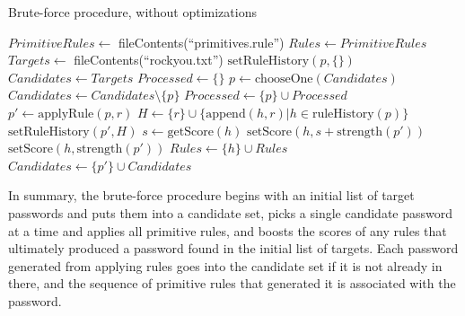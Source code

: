 \documentclass[letterpaper,twocolumn,10pt]{article}
\begin{document}
\begin{algorithm}\caption{Brute-force procedure, without optimizations}
\begin{algorithmic}[1]
\State $PrimitiveRules \gets $ fileContents(``primitives.rule'')
\State $Rules \gets PrimitiveRules$
\State $Targets \gets $ fileContents(``rockyou.txt'')
  \State $\mathrm{setRuleHistory}(p, \{\})$
\EndFor
\State $Candidates \gets Targets$
\State $Processed \gets \{\}$
  \State $p \gets \mathrm{chooseOne}(Candidates)$
  \State $Candidates \gets Candidates \setminus \{p\}$
  \State $Processed \gets \{p\} \cup Processed$
    \State $p' \gets \mathrm{applyRule}(p, r)$
    \State $H \gets \{r\}\cup\{\mathrm{append}(h, r)|h \in
\mathrm{ruleHistory}(p)\}$
    \State $\mathrm{setRuleHistory}(p', H)$
          \State $s \gets \mathrm{getScore}(h)$
          \State $\mathrm{setScore}(h,
s+\mathrm{strength}(p'))$
        \Else
          \State $\mathrm{setScore}(h, \mathrm{strength}(p'))$
          \State $Rules \gets \{h\}\cup Rules$
        \EndIf
      \EndFor
    \EndIf
      \State $Candidates \gets \{p'\}\cup Candidates$
    \EndIf
  \EndFor
\EndWhile
\end{algorithmic}
\end{algorithm}

In summary, the brute-force procedure begins with an initial list of target
passwords and puts them into a candidate set, picks a single candidate password
at a time and applies all primitive rules, and boosts the scores of any rules
that ultimately produced a password found in the initial list of targets. Each
password generated from applying rules goes into the candidate set if it is not
already in there, and the sequence of primitive rules that generated it is
associated with the password.
\end{document}
